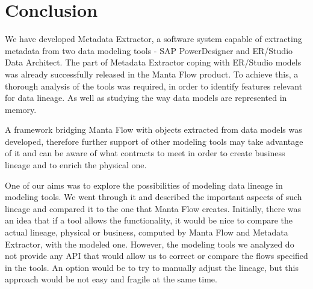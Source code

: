 \chapter*{Conclusion}
We have developed Metadata Extractor, a software system capable of extracting metadata from two data modeling tools - SAP PowerDesigner and ER/Studio Data Architect. 
The part of Metadata Extractor coping with ER/Studio models was already successfully released in the Manta Flow product.
To achieve this, a thorough analysis of the tools was required, in order to identify features relevant for data lineage. As well as studying the way data models are represented in memory.

A framework bridging Manta Flow with objects extracted from data models was developed, therefore further support of other modeling tools may take advantage of it and can be aware of what contracts to meet in order to create business lineage and to enrich the physical one.

One of our aims was to explore the possibilities of modeling data lineage in modeling tools.
We went through it and described the important aspects of such lineage and compared it to the one that Manta Flow creates. 
Initially, there was an idea that if a tool allows the functionality, it would be nice to compare the actual lineage, physical or business, computed by Manta Flow and Metadata Extractor, with the modeled one. 
However, the modeling tools we analyzed do not provide any API that would allow us to correct or compare the flows specified in the tools. 
An option would be to try to manually adjust the lineage, but this approach would be not easy and fragile at the same time.

